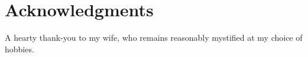\documentclass[journal=tosc,submission,notanonymous]{iacrtrans}
\begin{document}











\section*{Acknowledgments}
A hearty thank-you to my wife, who remains reasonably mystified at my choice
of hobbies.




\appendix




\end{document}
